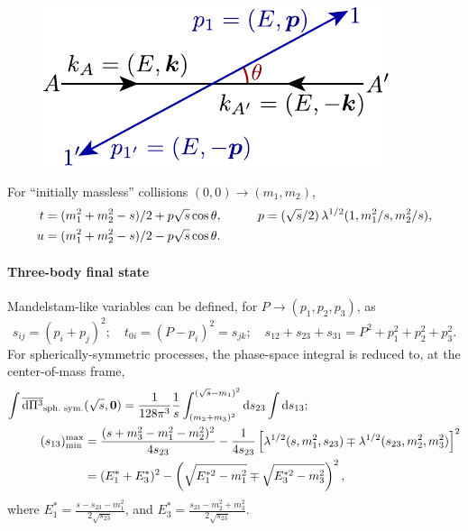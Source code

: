 \documentclass[CheatSheet]{subfiles}
\begin{document}
\begin{figure}\vspace{-2em}
 \includegraphics[width=\linewidth,page=2]{figs/collision.pdf}
\end{figure}

\noindent
For ``initially massless'' collisions $(0,0)\to (m_1,m_2)$,
\begin{alignat*}{2}
 t &= (m_1^2+m_2^2-s)/2+p\sqrt{s}\cos\theta,\qquad
&p&=(\sqrt{s}/2)\Kallen[1/2](1,m_1^2/s,m_2^2/s),\\
 u &= (m_1^2+m_2^2-s)/2-p\sqrt{s}\cos\theta.
\end{alignat*}

\paragraph{Three-body final state} Mandelstam-like variables can be defined, for $P\to(p_1,p_2,p_3)$, as
\begin{equation*}
s_{ij}=(p_i+p_j)^2;\quad t_{0i}=(P-p_i)^2=s_{jk};\quad s_{12}+s_{23}+s_{31}=P^2+p_1^2+p_2^2+p_3^2.
\end{equation*}
For spherically-symmetric processes, the phase-space integral is reduced to, at the center-of-mass frame,
\begin{align}
\int\overline{\dd\Pi^3}_{\text{sph.\ sym.}}&(\sqrt{s}, \vc 0)
=\frac{1}{128\pi^3}\frac{1}{s}
\int_{(m_2+m_3)^2}^{(\sqrt{s}-m_1)^2}\dd s_{23}\int\dd s_{13};
\\ (s_{13})^{\text{max}}_{\text{min}} &=
\frac{(s+m_3^2-m_1^2-m_2^2)^2}{4s_{23}}
-\frac{1}{4s_{23}}
\left[\Kallen[1/2](s,m_1^2,s_{23})\mp\Kallen[1/2](s_{23},m_2^2,m_3^2)\right]^2
\\&=(E_1^*+E_3^*)^2-\left(\sqrt{E_1^{*2}-m_1^2}\mp\sqrt{E_3^{*2}-m_3^2}\right)^2,
\quad
\end{align}
where 
$E_1^*=\frac{s-s_{23}-m_1^2}{2\sqrt{s_{23}}}$, and
$E_3^*=\frac{s_{23}-m_2^2+m_3^2}{2\sqrt{s_{23}}}$.
\end{document}
